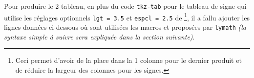 \documentclass[12pt,a4paper]{article}
\begin{document}
\begin{center}
\end{center}


Pour produire le 2\ieme{} tableau, en plus du code \verb#tkz-tab# pour le tableau de signe qui utilise les réglages optionnels \verb#lgt = 3.5# et 
\verb#espcl = 2.5# de 
\footnote{
	Ceci permet d'avoir de la place dans la 1\iere{} colonne pour le dernier produit et de réduire la largeur des colonnes pour les signes.
},
il a fallu ajouter les lignes données ci-dessous où sont utilisées les macros  et  proposées par \verb+lymath+ \emph{(la syntaxe simple à suivre sera expliquée dans la section suivante)}.

\medskip

\begin{latexex-alone}
\end{latexex-alone}
\end{document}
